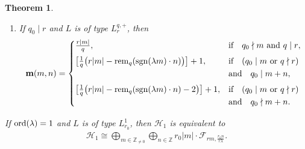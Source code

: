 \documentclass[10pt,a4paper]{amsart}
\newcommand\Z{{\mathbb Z}}
\newcommand\bm{\textbf{{\rm \textbf{m}}}}
\newcommand\cH{{\mathcal H}}
\newcommand{\sgn}{\mathop{{\rm sgn}}}
\newcommand{\rem}{\mathop{{\rm rem}}}
\newcommand{\ord}{{\rm ord}}
\numberwithin{equation}{section}
\newtheorem{Theorem}{Theorem}[section]
\begin{document}
\begin{Theorem}
\begin{enumerate}
\begin{enumerate}
\begin{gather*}
\begin{cases}
& \text{if\quad $n \equiv \overline{rm}$ {\rm mod}\ $q_0$},
\\[.5ex]
\big[\frac1q\big( r|m|-\rem_q(\sgn(\lambda m)\cdot n)-2\big)\big]+1,
& \text{if\quad $n\not\equiv \overline{rm}$ {\rm mod} $q_0$},
\end{cases}
\end{gather*}
where $\overline{rm}=\sgn(\lambda)rm$ if $3\mid q$ and $\overline{rm}=0$ otherwise.
%
\item[$(b)$]
 If $q_0\mid r$ and $L$ is of type $L_r^{q,+}$, then
\begin{gather*}
\bm(m,n) =
\begin{cases}
\frac{r|m|}{q},&\text{if\quad $q_0\nmid m$ and $q\mid r$},
\\[1ex]
\big[\frac1q\big(r|m|-\rem_q(\sgn(\lambda m)\cdot n)\big)\big]+1,
& \text{if\quad $(q_0\mid m$ or $q\nmid r)$}
\\
&\mbox{and}\quad q_0\mid m+n,
\\[1ex]
\big[\frac1q\big(r|m|-\rem_q(\sgn(\lambda m)\cdot n)-2\big)\big]+1,
&\text{if\quad $(q_0\mid m$ or $q\nmid r)$}\\ &\mbox{and}\quad q_0\nmid m+n.
\end{cases}
\end{gather*}
\end{enumerate}
If $\ord(\lambda)=1$ and $L$ is of type $L^1_{r_0}$, then $\cH_1$ is equivalent to
\begin{gather*}
\cH_1\cong\bigoplus_{m\in\Z _{\not=0}}\bigoplus_{n\in \Z} r_0|m|\cdot {\mathcal F}_{rm,\frac {r_0n}{r\lambda}}.
\end{gather*}
\end{enumerate}
\end{Theorem}
\end{document}
